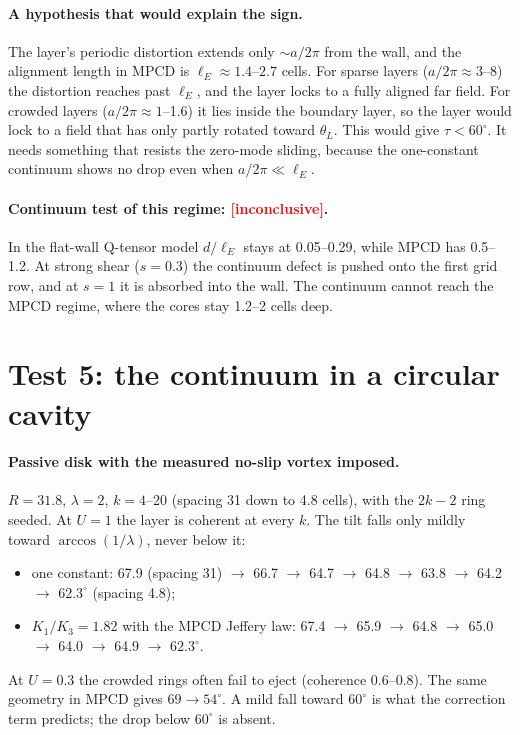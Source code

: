 \documentclass[11pt,a4paper]{article}
\newcommand{\verdict}[2]{\textbf{\textcolor{#1}{[#2]}}}
\begin{document}
\paragraph{A hypothesis that would explain the sign.} The layer's periodic distortion extends only $\sim a/2\pi$ from the wall, and the alignment length in MPCD is $\ell_E\approx1.4$--$2.7$ cells. For sparse layers ($a/2\pi\approx3$--8) the distortion reaches past $\ell_E$, and the layer locks to a fully aligned far field. For crowded layers ($a/2\pi\approx1$--1.6) it lies inside the boundary layer, so the layer would lock to a field that has only partly rotated toward $\theta_L$. This would give $\tau<60^\circ$. It needs something that resists the zero-mode sliding, because the one-constant continuum shows no drop even when $a/2\pi\ll\ell_E$.

\paragraph{Continuum test of this regime: \verdict{red}{inconclusive}.} In the flat-wall Q-tensor model $d/\ell_E$ stays at 0.05--0.29, while MPCD has 0.5--1.2. At strong shear ($s=0.3$) the continuum defect is pushed onto the first grid row, and at $s=1$ it is absorbed into the wall. The continuum cannot reach the MPCD regime, where the cores stay 1.2--2 cells deep.

\section{Test 5: the continuum in a circular cavity}

\paragraph{Passive disk with the measured no-slip vortex imposed.} $R=31.8$, $\lambda=2$, $k=4$--20 (spacing 31 down to 4.8 cells), with the $2k-2$ ring seeded. At $U=1$ the layer is coherent at every $k$. The tilt falls only mildly toward $\arccos(1/\lambda)$, never below it:
\begin{itemize}
\item one constant: 67.9 (spacing 31) $\to$ 66.7 $\to$ 64.7 $\to$ 64.8 $\to$ 63.8 $\to$ 64.2 $\to$ $62.3^\circ$ (spacing 4.8);
\item $K_1/K_3=1.82$ with the MPCD Jeffery law: 67.4 $\to$ 65.9 $\to$ 64.8 $\to$ 65.0 $\to$ 64.0 $\to$ 64.9 $\to$ $62.3^\circ$.
\end{itemize}
At $U=0.3$ the crowded rings often fail to eject (coherence 0.6--0.8). The same geometry in MPCD gives $69\to54^\circ$. A mild fall toward $60^\circ$ is what the correction term predicts; the drop below $60^\circ$ is absent.
\end{document}
